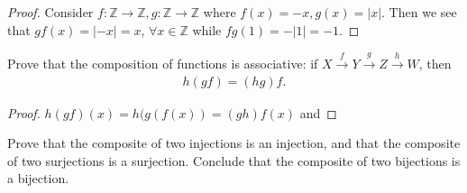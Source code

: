 \documentclass[12pt]{article}
\newenvironment{exercise}[2][Exercise]{\begin{trivlist}
\item[\hskip \labelsep {\bfseries #1}\hskip \labelsep {\bfseries #2.}]}
{\end{trivlist}}
\begin{document}
 \begin{proof}
    Consider $f:\mathbb{Z}\rightarrow\mathbb{Z}, g:\mathbb{Z}\rightarrow\mathbb{Z}$ where $f(x) = -x, g(x) = |x|$. Then we see that ${gf(x)=|-x|=x}$,  $\forall x\in \mathbb{Z}$ while ${fg(1)=-|1|=-1}$.
 \end{proof}

 \begin{exercise}{1.6}

Prove that the composition of functions is associative: if $X\xrightarrow{f}Y\xrightarrow{g}Z\xrightarrow{h}W$, then \begin{align*}h(gf)=(hg)f.\end{align*}
 \end{exercise}
\begin{proof}
     $h(gf) (x) = h(g(f(x)) = (gh)f(x)$ and 
\end{proof}

\begin{exercise}{1.7}

Prove that the composite of two injections is an injection, and that the composite of two surjections is a surjection. Conclude that the composite of two bijections is a bijection.
\end{exercise}




 
\end{document}
